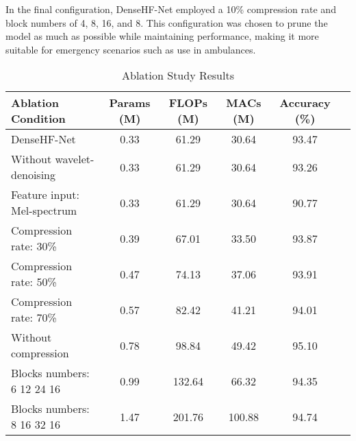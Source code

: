 In the final configuration, DenseHF-Net employed a 10\% compression rate and block numbers of 4, 8, 16, and 8. This configuration was chosen to prune the model as much as possible while maintaining performance, making it more suitable for emergency scenarios such as use in ambulances.
\begin{table*}[htbp]
    \centering
    \caption{Ablation Study Results}
    \label{table:ablation_results}
    \begin{tabularx}{\textwidth}{L|CCCCC}
    \toprule
    Ablation Condition & Params (M) & FLOPs (M) & MACs (M) & Accuracy (\%) \\ 
    \midrule
    DenseHF-Net            &0.33& 61.29& 30.64& 93.47 \\
    Without wavelet-denoising  &0.33& 61.29& 30.64& 93.26 \\
    Feature input: Mel-spectrum &0.33& 61.29& 30.64& 90.77\\
   Compression rate: 30\%& 0.39& 67.01& 33.50&93.87\\
   Compression rate: 50\%& 0.47& 74.13 & 37.06&93.91\\
   Compression rate: 70\%& 0.57& 82.42 & 41.21&94.01\\
   Without compression &0.78& 98.84& 49.42& 95.10\\
    Blocks numbers: 6 12 24 16  & 0.99    & 132.64     & 66.32     & 94.35  \\
    Blocks numbers: 8 16 32 16  & 1.47    & 201.76      & 100.88    & 94.74  \\
    \bottomrule
    \end{tabularx}
\end{table*}